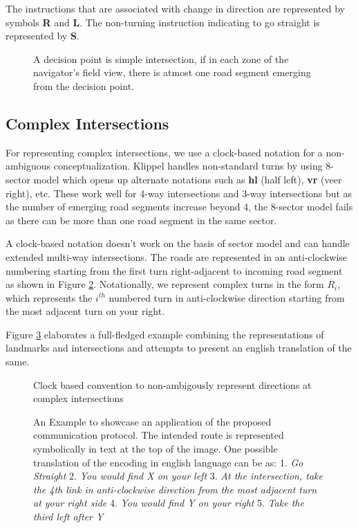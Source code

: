 \documentclass{iitkthesis}
\begin{document}
The instructions that are associated with change in direction are represented by symbols \textbf{R} and \textbf{L}. The non-turning instruction indicating to go straight is represented by \textbf{S}. 

\begin{figure}
\centering
\caption{A decision point is simple intersection, if in each zone of the navigator's field view, there is atmost one road segment emerging from the decision point.}
\label{fig:turnA}
 \end{figure}
\subsection{Complex Intersections}
For representing complex intersections, we use a clock-based notation for a non-ambiguous conceptualization. Klippel \cite{klippel} handles non-standard turns by using 8-sector model which opens up alternate notations such as \textbf{hl} (half left), \textbf{vr} (veer right), etc. These work well for 4-way intersections and 3-way intersections but as the number of emerging road segments increase beyond 4, the 8-sector model fails as there can be more than one road segment in the same sector.

A clock-based notation doesn't work on the basis of sector model and can handle extended multi-way intersections. The roads are represented in an anti-clockwise numbering starting from the first turn right-adjacent to incoming road segment as shown in Figure \ref{fig:complex}. Notationally, we represent complex turns in the form $R_i$, which represents the $i^{th}$ numbered turn in anti-clockwise direction starting from the most adjacent turn on your right.

Figure \ref{fig:complexex} elaborates a full-fledged example combining the representations of landmarks and intersections and attempts to present an english translation of the same.

\begin{figure}
\centering
\caption{Clock based convention to non-ambigously represent directions at complex intersections}
\label{fig:complex}
 \end{figure}
\begin{figure}
\centering
\caption{An Example to showcase an application of the proposed communication protocol. The intended route is represented symbolically in text at the top of the image. One possible translation of the encoding in english language can be as: 
1. \textit{Go Straight}
2. \textit{You would find X on your left}
3. \textit{At the intersection, take the 4th link in anti-clockwise direction from the most adjacent turn at your right side} 
4. \textit{You would find Y on your right}
5. \textit{Take the third left after Y}
}
\label{fig:complexex}
 \end{figure} 
\end{document}
